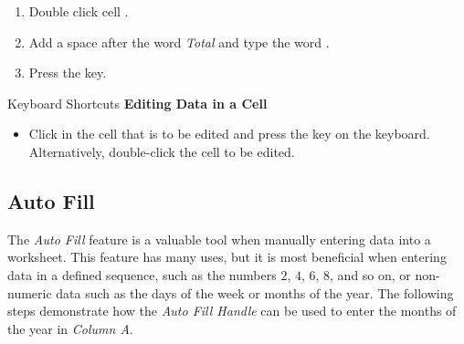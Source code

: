 \begin{enumbox}
\begin{enumerate}
		\item Double click cell .
		\item Add a space after the word \textit{Total} and type the word .
		\item Press the  key.
	\end{enumerate}
\end{enumbox}
	
\begin{center}
	\begin{shtcutbox}{Keyboard Shortcuts}
		\textbf{Editing Data in a Cell}
		\\
		\begin{itemize}
			\setlength{\itemsep}{0pt}
			\setlength{\parskip}{0pt}
			\setlength{\parsep}{0pt}
			
			\item Click in the cell that is to be edited and press the  key on the keyboard. Alternatively, double-click the cell to be edited.
			
		\end{itemize}
	\end{shtcutbox}
\end{center}

\subsection{Auto Fill}

The \textit{Auto Fill} feature is a valuable tool when manually entering data into a worksheet. This feature has many uses, but it is most beneficial when entering data in a defined sequence, such as the numbers $ 2 $, $ 4 $, $ 6 $, $ 8 $, and so on, or non-numeric data such as the days of the week or months of the year. The following steps demonstrate how the \textit{Auto Fill Handle} can be used to enter the months of the year in \textit{Column A}.

